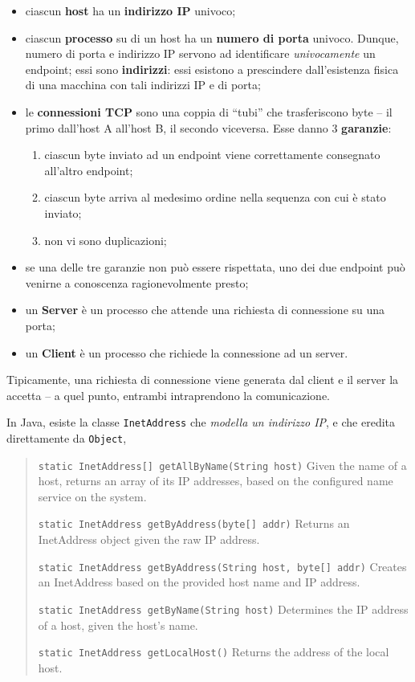 \documentclass[\fontsizeclass,twocolumn]{\classname}
\theoremstyle{definition}
\theoremstyle{definition}
\begin{document}
\begin{itemize}
    \item ciascun \textbf{host} ha un \textbf{indirizzo IP} univoco;
    \item ciascun \textbf{processo} su di un host ha un \textbf{numero di
        porta} univoco. Dunque, numero di porta e indirizzo IP servono ad
        identificare \emph{univocamente} un endpoint; essi sono
        \textbf{indirizzi}: essi esistono a prescindere dall'esistenza fisica
        di una macchina con tali indirizzi IP e di porta;
    \item le \textbf{connessioni TCP} sono una coppia di ``tubi'' che
        trasferiscono byte -- il primo dall'host A all'host B, il secondo
        viceversa. Esse danno 3 \textbf{garanzie}:
        \begin{enumerate}
            \item ciascun byte inviato ad un endpoint viene correttamente
                consegnato all'altro endpoint;
            \item ciascun byte arriva al medesimo ordine nella sequenza con cui
                è stato inviato;
            \item non vi sono duplicazioni;
        \end{enumerate}
    \item se una delle tre garanzie non può essere rispettata, uno dei due
        endpoint può venirne a conoscenza ragionevolmente presto;
    \item un \textbf{Server} è un processo che attende una richiesta di
        connessione su una porta;
    \item un \textbf{Client} è un processo che richiede la connessione ad un
        server.
\end{itemize}

Tipicamente, una richiesta di connessione viene generata dal client e il server
la accetta -- a quel punto, entrambi intraprendono la comunicazione.

In Java, esiste la classe \texttt{InetAddress} che \emph{modella un indirizzo
IP}, e che eredita direttamente da \texttt{Object},

\begin{quote}
    \footnotesize{\texttt{static InetAddress[] 	getAllByName(String host)} 	Given the name of a host, returns an array of its IP addresses, based on the configured name service on the system.

            \texttt{static InetAddress 	getByAddress(byte[] addr)} 	Returns an InetAddress object given the raw IP address.

    \texttt{static InetAddress 	getByAddress(String host, byte[] addr)} 	Creates an InetAddress based on the provided host name and IP address.

    \texttt{static InetAddress 	getByName(String host)} 	Determines the IP address of a host, given the host's name.

    \texttt{static InetAddress 	getLocalHost()} 	Returns the address of the local host.
}
\end{quote}
\end{document}
